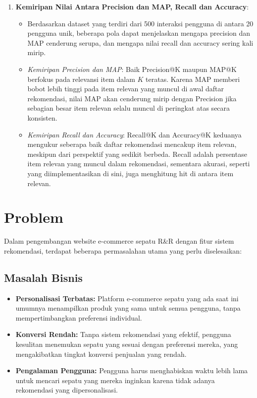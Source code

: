 \documentclass[journal,article,submit,pdftex,moreauthors]{Definitions/mdpi}
\begin{document}
\begin{enumerate}
    \item \textbf{Kemiripan Nilai Antara Precision dan MAP, Recall dan Accuracy}:
    \begin{itemize}
        \item Berdasarkan dataset yang terdiri dari 500 interaksi pengguna di antara 20 pengguna unik, beberapa pola dapat menjelaskan mengapa precision dan MAP cenderung serupa, dan mengapa nilai recall dan accuracy sering kali mirip.
        \item \textit{Kemiripan Precision dan MAP}: Baik Precision@K maupun MAP@K berfokus pada relevansi item dalam \( K \) teratas. Karena MAP memberi bobot lebih tinggi pada item relevan yang muncul di awal daftar rekomendasi, nilai MAP akan cenderung mirip dengan Precision jika sebagian besar item relevan selalu muncul di peringkat atas secara konsisten.
        \item \textit{Kemiripan Recall dan Accuracy}: Recall@K dan Accuracy@K keduanya mengukur seberapa baik daftar rekomendasi mencakup item relevan, meskipun dari perspektif yang sedikit berbeda. Recall adalah persentase item relevan yang muncul dalam rekomendasi, sementara akurasi, seperti yang diimplementasikan di sini, juga menghitung hit di antara item relevan.
    \end{itemize}
\end{enumerate}



\section{Problem}

Dalam pengembangan website e-commerce sepatu R\&R dengan fitur sistem rekomendasi, terdapat beberapa permasalahan utama yang perlu diselesaikan:

\subsection{Masalah Bisnis}
\begin{itemize}
    \item \textbf{Personalisasi Terbatas:} Platform e-commerce sepatu yang ada saat ini umumnya menampilkan produk yang sama untuk semua pengguna, tanpa mempertimbangkan preferensi individual.
    
    \item \textbf{Konversi Rendah:} Tanpa sistem rekomendasi yang efektif, pengguna kesulitan menemukan sepatu yang sesuai dengan preferensi mereka, yang mengakibatkan tingkat konversi penjualan yang rendah.
    
    \item \textbf{Pengalaman Pengguna:} Pengguna harus menghabiskan waktu lebih lama untuk mencari sepatu yang mereka inginkan karena tidak adanya rekomendasi yang dipersonalisasi.
\end{itemize}
\end{document}

